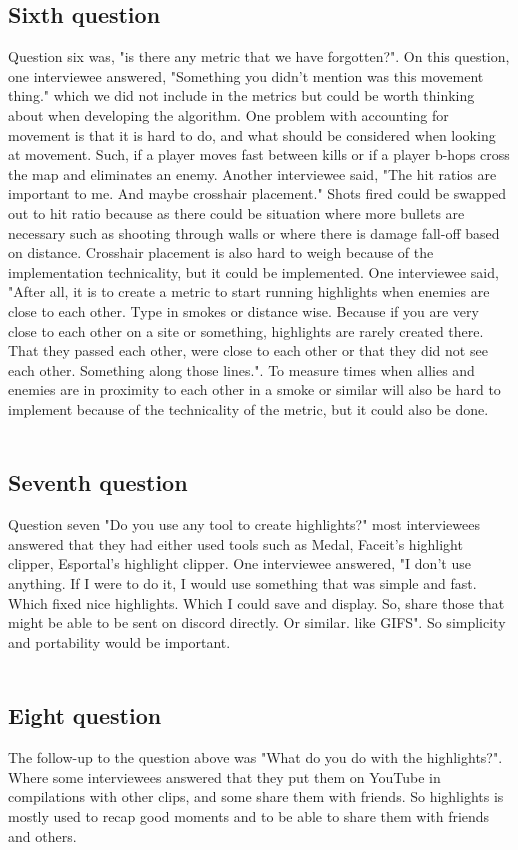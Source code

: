 \documentclass[a4paper,twoside]{bth}
\begin{document}
\subsection{Sixth question}
Question six was, "is there any metric that we have forgotten?". On this question, one interviewee answered, "Something you didn't mention was this movement thing." which we did not include in the metrics but could be worth thinking about when developing the algorithm. One problem with accounting for movement is that it is hard to do, and what should be considered when looking at movement. Such, if a player moves fast between kills or if a player b-hops cross the map and eliminates an enemy. Another interviewee said, "The hit ratios are important to me. And maybe crosshair placement." Shots fired could be swapped out to hit ratio because as there could be situation where more bullets are necessary such as shooting through walls or where there is damage fall-off based on distance. Crosshair placement is also hard to weigh because of the implementation technicality, but it could be implemented. One interviewee said, "After all, it is to create a metric to start running highlights when enemies are close to each other. Type in smokes or distance wise. Because if you are very close to each other on a site or something, highlights are rarely created there. That they passed each other, were close to each other or that they did not see each other. Something along those lines.". To measure times when allies and enemies are in proximity to each other in a smoke or similar will also be hard to implement because of the technicality of the metric, but it could also be done. \\\\
\subsection{Seventh question}
Question seven "Do you use any tool to create highlights?" most interviewees answered that they had either used tools such as Medal, Faceit's highlight clipper, Esportal's highlight clipper. One interviewee answered, "I don't use anything. If I were to do it, I would use something that was simple and fast. Which fixed nice highlights. Which I could save and display. So, share those that might be able to be sent on discord directly. Or similar. like GIFS". So simplicity and portability would be important.\\\\
\subsection{Eight question}
The follow-up to the question above was "What do you do with the highlights?". Where some interviewees answered that they put them on YouTube in compilations with other clips, and some share them with friends. So highlights is mostly used to recap good moments and to be able to share them with friends and others.
\\\\
\end{document}
